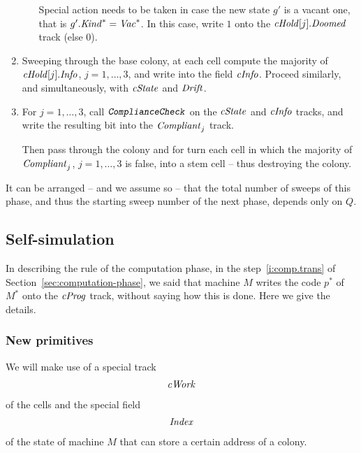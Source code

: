 \documentclass[12pt]{memoir}
\newcommand{\fld}[1]{\ensuremath{\textit{#1\/}}}
\newcommand{\rul}[1]{\ensuremath{\texttt{\slshape #1\/}}}
\newcommand{\Vacant}{\mathit{Vac}}
\newcommand{\Drift}{\fld{Drift}}
\newcommand{\Doomed}{\fld{Doomed}}
\newcommand{\cHold}{\fld{cHold}}
\newcommand{\Index}{\fld{Index}}
\newcommand{\Info}{\fld{Info}}
\newcommand{\cInfo}{\fld{cInfo}}
\newcommand{\Kind}{\fld{Kind}}
\newcommand{\cProg}{\fld{cProg}}
\newcommand{\cState}{\fld{cState}}
\newcommand{\cWork}{\fld{cWork}}
\begin{document}
\begin{enumerate}
\begin{enumerate}
              Special action needs to be taken in case 
              the new state \( g' \) is a vacant one, that is 
              \( g'.\Kind^{*}=\Vacant^{*} \).
              In this case, write \( 1 \) onto the \( \cHold[j].\Doomed \) track (else 0).

        \end{enumerate}

       \item
            Sweeping through the base colony,
            at each cell compute the majority of \( \cHold[j].\Info \), \( j=1,\dots,3 \),
            and write into the field \( \cInfo \).
            Proceed similarly, and simultaneously, with \( \cState \) and \( \Drift \).

       \item       For \( j=1,\dots,3 \), call \( \rul{ComplianceCheck} \) on the \( \cState \)
and \( \cInfo \) tracks, and
write the resulting bit into the \( \fld{Compliant}_{j} \) track.

Then pass through the colony and for turn each cell in which the majority 
of \( \fld{Compliant}_{j} \), \( j=1,\dots,3 \) is false, into a stem cell
-- thus destroying the colony.

  \end{enumerate}

It can be arranged -- and we assume so -- that the total number of sweeps of this
phase, and thus the starting sweep number of the next phase,
depends only on \( Q \).

\subsection{Self-simulation}\label{sec:self-simulation}

In describing the rule of the computation phase,
in the step~\ref{i:comp.trans} of Section~\ref{sec:computation-phase},
we said that machine \( M \) writes the code \( p^{*} \)
of \( M^{*} \) onto the \( \cProg \) track, without saying how this is done.
Here we give the details.

\subsubsection{New primitives}

We will make use of a special track
\begin{align*}
   \cWork
 \end{align*}
of the cells and the special field
\begin{align*}
   \Index
 \end{align*}
of the state of machine \( M \) that can store a certain address of a colony.
\end{document}
